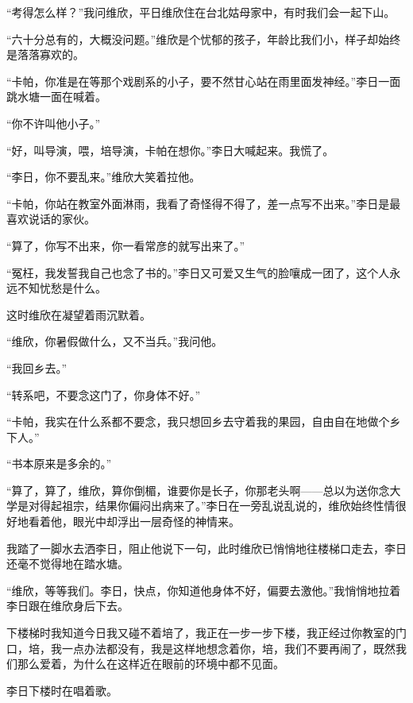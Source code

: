 \par “考得怎么样？”我问维欣，平日维欣住在台北姑母家中，有时我们会一起下山。
\par “六十分总有的，大概没问题。”维欣是个忧郁的孩子，年龄比我们小，样子却始终是落落寡欢的。
\par “卡帕，你准是在等那个戏剧系的小子，要不然甘心站在雨里面发神经。”李日一面跳水塘一面在喊着。
\par “你不许叫他小子。”
\par “好，叫导演，喂，培导演，卡帕在想你。”李日大喊起来。我慌了。
\par “李日，你不要乱来。”维欣大笑着拉他。
\par “卡帕，你站在教室外面淋雨，我看了奇怪得不得了，差一点写不出来。”李日是最喜欢说话的家伙。
\par “算了，你写不出来，你一看常彦的就写出来了。”
\par “冤枉，我发誓我自己也念了书的。”李日又可爱又生气的脸嚷成一团了，这个人永远不知忧愁是什么。
\par 这时维欣在凝望着雨沉默着。
\par “维欣，你暑假做什么，又不当兵。”我问他。
\par “我回乡去。”
\par “转系吧，不要念这门了，你身体不好。”
\par “卡帕，我实在什么系都不要念，我只想回乡去守着我的果园，自由自在地做个乡下人。”
\par “书本原来是多余的。”
\par “算了，算了，维欣，算你倒楣，谁要你是长子，你那老头啊——总以为送你念大学是对得起祖宗，结果你偏闷出病来了。”李日在一旁乱说乱说的，维欣始终性情很好地看着他，眼光中却浮出一层奇怪的神情来。
\par 我踏了一脚水去洒李日，阻止他说下一句，此时维欣已悄悄地往楼梯口走去，李日还毫不觉得地在踏水塘。
\par “维欣，等等我们。李日，快点，你知道他身体不好，偏要去激他。”我悄悄地拉着李日跟在维欣身后下去。
\par 下楼梯时我知道今日我又碰不着培了，我正在一步一步下楼，我正经过你教室的门口，培，我一点办法都没有，我是这样地想念着你，培，我们不要再闹了，既然我们那么爱着，为什么在这样近在眼前的环境中都不见面。
\par 李日下楼时在唱着歌。
